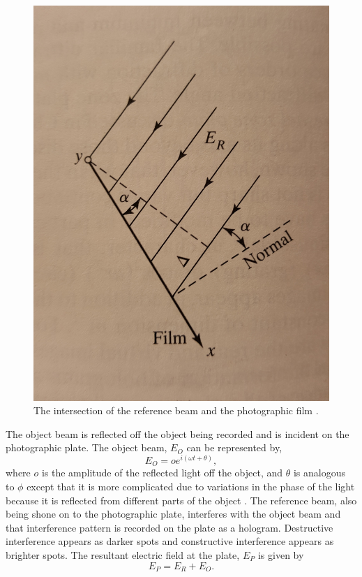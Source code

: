 \documentclass[ notitlepage, numerical, 11pt]{revtex4-1} %
\begin{document}
\begin{figure}[H]
\centerline{\includegraphics[scale = .17]{eRefMath.jpg}}
\caption{The intersection of the reference beam and the photographic film \cite{optics}.}
\label{eRefMath}
\end{figure} The object beam is reflected off the object being recorded and is incident on the photographic plate. The object beam, $E_O$ can be represented by,
\begin{equation}
E_{O} = oe^{i(\omega t + \theta)},
\label{eObj}
\end{equation}
where $o$ is the amplitude of the reflected light off the object, and $\theta$ is analogous to $\phi$ except that it is more complicated due to variations in the phase of the light because it is reflected from different parts of the object \cite{optics}. The reference beam, also being shone on to the photographic plate, interferes with the object beam and that interference pattern is recorded on the plate as a hologram. Destructive interference appears as darker spots and constructive interference appears as brighter spots. 
The resultant electric field at the plate, $E_P$ is given by
\begin{equation}
E_{P} = E_R + E_O.
\label{Ef}
\end{equation}
\end{document}
